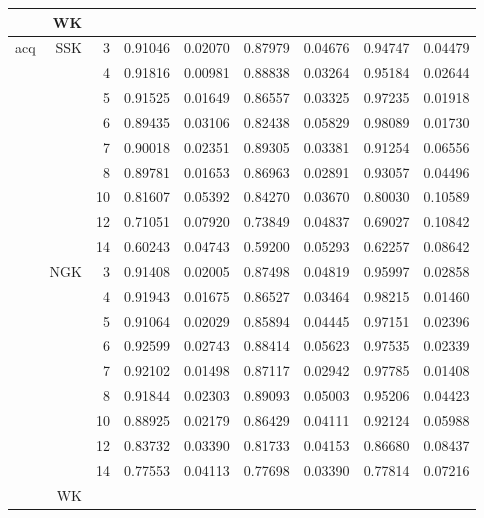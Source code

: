 \documentclass{article}
\theoremstyle{definition}
\begin{document}
\begin{table}[]
\begin{tabular}{|l|r|r|r|r|r|r|r|r|}
   & WK  &   &   & &   & &   & \\ \hline
\multirow{19}{*}{acq}    
   & SSK & 3 &0.91046 &0.02070 &0.87979 &0.04676 &0.94747 &0.04479\\
   &   & 4   &0.91816 &0.00981 &0.88838 &0.03264 &0.95184 &0.02644\\
   &   & 5   &0.91525 &0.01649 &0.86557 &0.03325 &0.97235 &0.01918\\
   &   & 6   &0.89435 &0.03106 &0.82438 &0.05829 &0.98089 &0.01730\\
   &   & 7   &0.90018 &0.02351 &0.89305 &0.03381 &0.91254 &0.06556\\
   &   & 8   &0.89781 &0.01653 &0.86963 &0.02891 &0.93057 &0.04496\\
   &   & 10  &0.81607 &0.05392 &0.84270 &0.03670 &0.80030 &0.10589\\
   &   & 12  &0.71051 &0.07920 &0.73849 &0.04837 &0.69027 &0.10842\\
   &   & 14  &0.60243 &0.04743 &0.59200 &0.05293 &0.62257 &0.08642\\ \cline{2-9} 
   & NGK & 3   &0.91408 &0.02005 &0.87498 &0.04819 &0.95997 &0.02858\\
   &   & 4   &0.91943 &0.01675 &0.86527 &0.03464 &0.98215 &0.01460\\
   &   & 5   &0.91064 &0.02029 &0.85894 &0.04445 &0.97151 &0.02396\\
   &   & 6   &0.92599 &0.02743 &0.88414 &0.05623 &0.97535 &0.02339\\
   &   & 7   &0.92102 &0.01498 &0.87117 &0.02942 &0.97785 &0.01408\\
   &   & 8   &0.91844 &0.02303 &0.89093 &0.05003 &0.95206 &0.04423\\
   &   & 10  &0.88925 &0.02179 &0.86429 &0.04111 &0.92124 &0.05988\\
   &   & 12  &0.83732 &0.03390 &0.81733 &0.04153 &0.86680 &0.08437\\
   &   & 14  &0.77553 &0.04113 &0.77698 &0.03390 &0.77814 &0.07216\\ \cline{2-9} 
   & WK  &   &   & &   & &   & \\ \hline
\end{tabular}
\end{table}
\end{document}
